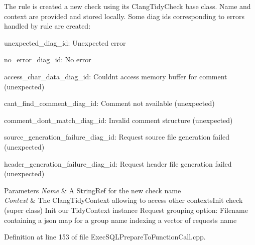 The rule is created a new check using its {\ttfamily Clang\+Tidy\+Check} base class. Name and context are provided and stored locally. Some diag ids corresponding to errors handled by rule are created\+:
\begin{DoxyItemize}
\item unexpected\+\_\+diag\+\_\+id\+: Unexpected error
\item no\+\_\+error\+\_\+diag\+\_\+id\+: No error
\item access\+\_\+char\+\_\+data\+\_\+diag\+\_\+id\+: Couldn\textquotesingle{}t access memory buffer for comment (unexpected)
\item cant\+\_\+find\+\_\+comment\+\_\+diag\+\_\+id\+: Comment not available (unexpected)
\item comment\+\_\+dont\+\_\+match\+\_\+diag\+\_\+id\+: Invalid comment structure (unexpected)
\item source\+\_\+generation\+\_\+failure\+\_\+diag\+\_\+id\+: Request source file generation failed (unexpected)
\item header\+\_\+generation\+\_\+failure\+\_\+diag\+\_\+id\+: Request header file generation failed (unexpected)
\end{DoxyItemize}


\begin{DoxyParams}{Parameters}
{\em Name} & A String\+Ref for the new check name \\
\hline
{\em Context} & The Clang\+Tidy\+Context allowing to access other contexts\+Init check (super class) Init our Tidy\+Context instance Request grouping option\+: Filename containing a json map for a group name indexing a vector of requests name \\
\hline
\end{DoxyParams}


Definition at line 153 of file Exec\+S\+Q\+L\+Prepare\+To\+Function\+Call.\+cpp.

